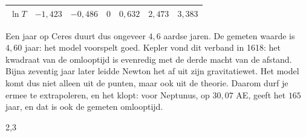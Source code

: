 {{{\begin{tabular}{|c|c|c|c|c|c|c|}
$\ln T$ & $-1{,}423$ & $-0{,}486$ & $0$ & $0{,}632$ & $2{,}473$ & $3{,}383$ \\ \hline
\end{tabular}}\hspace{1cm}%
}
Een jaar op Ceres duurt dus ongeveer $4{,}6$ aardse jaren. De gemeten waarde is $4{,}60$ jaar: het model voorspelt goed. Kepler vond dit verband in 1618: het kwadraat van de omlooptijd is evenredig met de derde macht van de afstand. Bijna zeventig jaar later leidde Newton het af uit zijn gravitatiewet. Het model komt dus niet alleen uit de punten, maar ook uit de theorie. Daarom durf je ermee te extrapoleren, en het klopt: voor Neptunus, op $30{,}07$ AE, geeft het $165$ jaar, en dat is ook de gemeten omlooptijd.}

\opdrachtenkop

\begin{oefeningen}



















\begin{alleenvoor}{2,3}

\end{alleenvoor}

\end{oefeningen}

